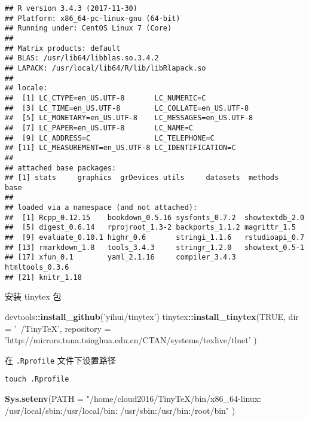 \documentclass[]{ctexbook}
\newenvironment{Shaded}{\begin{snugshade}}{\end{snugshade}}
\newcommand{\KeywordTok}[1]{\textcolor[rgb]{0.13,0.29,0.53}{\textbf{#1}}}
\newcommand{\DataTypeTok}[1]{\textcolor[rgb]{0.13,0.29,0.53}{#1}}
\newcommand{\StringTok}[1]{\textcolor[rgb]{0.31,0.60,0.02}{#1}}
\newcommand{\OtherTok}[1]{\textcolor[rgb]{0.56,0.35,0.01}{#1}}
\newcommand{\OperatorTok}[1]{\textcolor[rgb]{0.81,0.36,0.00}{\textbf{#1}}}
\newcommand{\NormalTok}[1]{#1}
\theoremstyle{definition}
\theoremstyle{definition}
\theoremstyle{definition}
\theoremstyle{remark}
\begin{document}
\begin{verbatim}
## R version 3.4.3 (2017-11-30)
## Platform: x86_64-pc-linux-gnu (64-bit)
## Running under: CentOS Linux 7 (Core)
## 
## Matrix products: default
## BLAS: /usr/lib64/libblas.so.3.4.2
## LAPACK: /usr/local/lib64/R/lib/libRlapack.so
## 
## locale:
##  [1] LC_CTYPE=en_US.UTF-8       LC_NUMERIC=C              
##  [3] LC_TIME=en_US.UTF-8        LC_COLLATE=en_US.UTF-8    
##  [5] LC_MONETARY=en_US.UTF-8    LC_MESSAGES=en_US.UTF-8   
##  [7] LC_PAPER=en_US.UTF-8       LC_NAME=C                 
##  [9] LC_ADDRESS=C               LC_TELEPHONE=C            
## [11] LC_MEASUREMENT=en_US.UTF-8 LC_IDENTIFICATION=C       
## 
## attached base packages:
## [1] stats     graphics  grDevices utils     datasets  methods   base     
## 
## loaded via a namespace (and not attached):
##  [1] Rcpp_0.12.15    bookdown_0.5.16 sysfonts_0.7.2  showtextdb_2.0 
##  [5] digest_0.6.14   rprojroot_1.3-2 backports_1.1.2 magrittr_1.5   
##  [9] evaluate_0.10.1 highr_0.6       stringi_1.1.6   rstudioapi_0.7 
## [13] rmarkdown_1.8   tools_3.4.3     stringr_1.2.0   showtext_0.5-1 
## [17] xfun_0.1        yaml_2.1.16     compiler_3.4.3  htmltools_0.3.6
## [21] knitr_1.18
\end{verbatim}

安装 tinytex 包

\begin{Shaded}
\begin{Highlighting}[]
\NormalTok{devtools}\OperatorTok{::}\KeywordTok{install_github}\NormalTok{(}\StringTok{'yihui/tinytex'}\NormalTok{)}
\NormalTok{tinytex}\OperatorTok{::}\KeywordTok{install_tinytex}\NormalTok{(}\OtherTok{TRUE}\NormalTok{, }\DataTypeTok{dir =} \StringTok{'~/TinyTeX'}\NormalTok{, }
    \DataTypeTok{repository =} \StringTok{'http://mirrors.tuna.tsinghua.edu.cn/CTAN/systems/texlive/tlnet'}\NormalTok{ )}
\end{Highlighting}
\end{Shaded}

在 \texttt{.Rprofile} 文件下设置路径

\begin{verbatim}
touch .Rprofile
\end{verbatim}

\begin{Shaded}
\begin{Highlighting}[]
\KeywordTok{Sys.setenv}\NormalTok{(}\DataTypeTok{PATH =} \StringTok{"/home/cloud2016/TinyTeX/bin/x86_64-linux:}
\StringTok{                   /usr/local/sbin:/usr/local/bin:}
\StringTok{                   /usr/sbin:/usr/bin:/root/bin"}\NormalTok{ )}
\end{Highlighting}
\end{Shaded}
\end{document}
